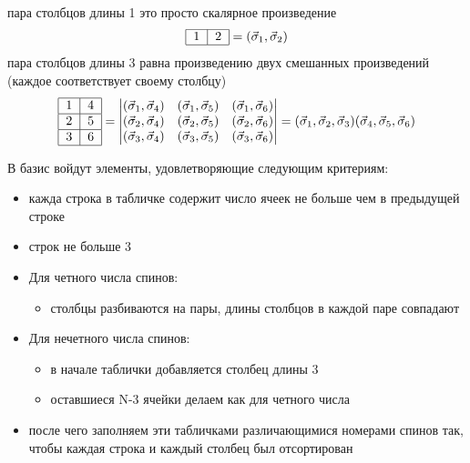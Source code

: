\documentclass[]{article}
\begin{document}
пара столбцов длины 1 это просто скалярное произведение
$$\begin{tabular}{ |l|l| }
\hline
1 & 2 \\
\hline
\end{tabular}
= (\vec \sigma_1, \vec \sigma_2)
$$
пара столбцов длины 3 равна произведению двух смешанных произведений (каждое соответствует  своему столбцу)
$$ \begin{tabular}{ |l|l| }
\hline
1 & 4 \\ \hline
2 & 5\\ \hline
3 & 6\\
\hline
\end{tabular}
= 
\begin{vmatrix}
(\vec\sigma_1,\vec\sigma_4) & (\vec\sigma_1,\vec\sigma_5) & (\vec\sigma_1,\vec\sigma_6) \\
(\vec\sigma_2,\vec\sigma_4) & (\vec\sigma_2,\vec\sigma_5) & (\vec\sigma_2,\vec\sigma_6) \\
(\vec\sigma_3,\vec\sigma_4) & (\vec\sigma_3,\vec\sigma_5) & (\vec\sigma_3,\vec\sigma_6) \\
\end{vmatrix}
=
(\vec \sigma_1, \vec \sigma_2, \vec \sigma_3)
(\vec \sigma_4, \vec \sigma_5, \vec \sigma_6)
$$

В базис войдут элементы, удовлетворяющие следующим критериям:
\begin{itemize}
	\item кажда строка в табличке содержит число ячеек не больше чем в предыдущей строке
	\item строк не больше 3
	\item Для четного числа спинов:
	\begin{itemize}
		\item столбцы разбиваются на пары, длины столбцов в каждой паре совпадают
	\end{itemize}
	\item Для нечетного числа спинов:
	\begin{itemize}
		\item в начале таблички добавляется столбец длины 3
		\item оставшиеся N-3 ячейки делаем как для четного числа
	\end{itemize}
	\item после чего заполняем эти табличками различающимися номерами спинов так, чтобы каждая строка и каждый столбец был отсортирован
\end{itemize}
\end{document}
